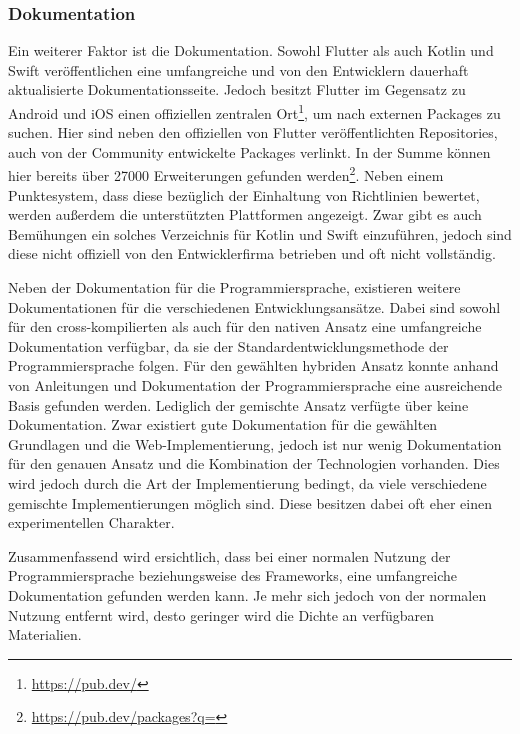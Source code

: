 \subsubsection{Dokumentation}
Ein weiterer Faktor ist die Dokumentation. Sowohl Flutter als auch Kotlin und Swift veröffentlichen eine umfangreiche und von den Entwicklern dauerhaft aktualisierte Dokumentationsseite. Jedoch besitzt Flutter im Gegensatz zu Android und iOS einen offiziellen zentralen Ort\footnote{\url{https://pub.dev/}}, um nach externen Packages zu suchen. Hier sind neben den offiziellen von Flutter veröffentlichten Repositories, auch von der Community entwickelte Packages verlinkt. In der Summe können hier bereits über 27000 Erweiterungen gefunden werden\footnote{\url{https://pub.dev/packages?q=}}. Neben einem Punktesystem, dass diese bezüglich der Einhaltung von Richtlinien bewertet, werden außerdem die unterstützten Plattformen angezeigt. Zwar gibt es auch Bemühungen ein solches Verzeichnis für Kotlin und Swift einzuführen, jedoch sind diese nicht offiziell von den Entwicklerfirma betrieben und oft nicht vollständig.

Neben der Dokumentation für die Programmiersprache, existieren weitere Dokumentationen für die verschiedenen Entwicklungsansätze. Dabei sind sowohl für den cross-kompilierten als auch für den nativen Ansatz eine umfangreiche Dokumentation verfügbar, da sie der Standardentwicklungsmethode der Programmiersprache folgen. Für den gewählten hybriden Ansatz konnte anhand von Anleitungen und Dokumentation der Programmiersprache eine ausreichende Basis gefunden werden. Lediglich der gemischte Ansatz verfügte über keine Dokumentation. Zwar existiert gute Dokumentation für die gewählten Grundlagen und die Web-Implementierung, jedoch ist nur wenig Dokumentation für den genauen Ansatz und die Kombination der Technologien vorhanden. Dies wird jedoch durch die Art der Implementierung bedingt, da viele verschiedene gemischte Implementierungen möglich sind. Diese besitzen dabei oft eher einen experimentellen Charakter.

Zusammenfassend wird ersichtlich, dass bei einer normalen Nutzung der Programmiersprache beziehungsweise des Frameworks, eine umfangreiche Dokumentation gefunden werden kann. Je mehr sich jedoch von der normalen Nutzung entfernt wird, desto geringer wird die Dichte an verfügbaren Materialien. 

